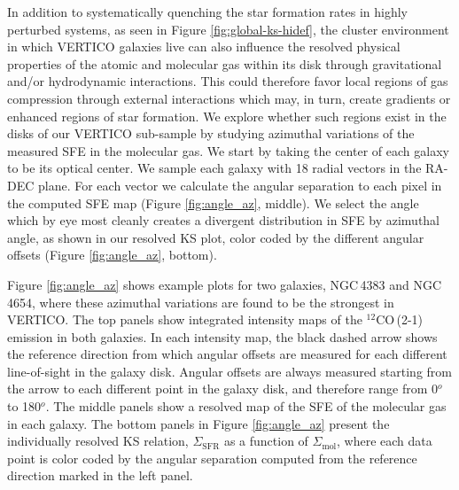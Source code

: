 \documentclass[longauth]{aa}
\begin{document}
In addition to systematically quenching the star formation rates in highly perturbed systems, as seen in Figure \ref{fig:global-ks-hidef}, the cluster environment in which VERTICO galaxies live can also influence the resolved physical properties of the atomic and molecular gas within its disk through gravitational and/or hydrodynamic interactions. This could therefore favor local regions of gas compression through external interactions which may, in turn, create gradients or enhanced regions of star formation. We explore whether such regions exist in the disks of our VERTICO sub-sample by studying azimuthal variations of the measured SFE in the molecular gas. We start by taking the center of each galaxy to be its optical center. We sample each galaxy with 18 radial vectors in the RA-DEC plane. For each vector we calculate the angular separation to each pixel in the computed SFE map (Figure \ref{fig:angle_az}, middle). We select the angle which by eye most cleanly creates a divergent distribution in SFE by azimuthal angle, as shown in our resolved KS plot, color coded by the different angular offsets (Figure \ref{fig:angle_az}, bottom).

Figure \ref{fig:angle_az} shows example plots for two galaxies, NGC\,4383 and NGC\,4654, where these azimuthal variations are found to be the strongest in VERTICO. The top panels show integrated intensity maps of the $^{12}$CO\,(2-1) emission in both galaxies. In each intensity map, the black dashed arrow shows the reference direction from which angular offsets are measured for each different line-of-sight in the galaxy disk. Angular offsets are always measured starting from the arrow to each different point in the galaxy disk, and therefore range from 0$^o$ to 180$^o$. The middle panels show a resolved map of the SFE of the molecular gas in each galaxy. The bottom panels in Figure \ref{fig:angle_az} present the individually resolved KS relation, $\Sigma_\mathrm{SFR}$ as a function of $\Sigma_\mathrm{mol}$, where each data point is color coded by the angular separation computed from the reference direction marked in the left panel.
\end{document}
